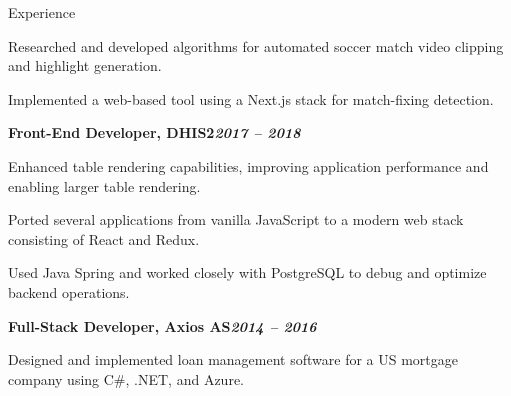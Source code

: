 \begin{rubric}{Experience}
\begin{compactitem}
    \item Researched and developed algorithms for automated soccer match video clipping and highlight generation.
    \item Implemented a web-based tool using a Next.js stack for match-fixing detection.
    \vspace{-12pt}
\end{compactitem}
%
\entry*[]%
\textbf{Front-End Developer, DHIS2\hfill\textit{2017 -- 2018}} \par
    \begin{compactitem}
    \item Enhanced table rendering capabilities, improving application performance and enabling larger table rendering.
    \item Ported several applications from vanilla JavaScript to a modern web stack consisting of React and Redux.
    \item Used Java Spring and worked closely with PostgreSQL to debug and optimize backend operations.
    \vspace{-12pt}
\end{compactitem}
%
\entry*[]%
\textbf{Full-Stack Developer, Axios AS\hfill\textit{2014 -- 2016}} \par
\begin{compactitem}
    \item Designed and implemented loan management software for a US mortgage company using C\#, .NET, and Azure.
    \vspace{-12pt}
\end{compactitem}
%
\end{rubric}